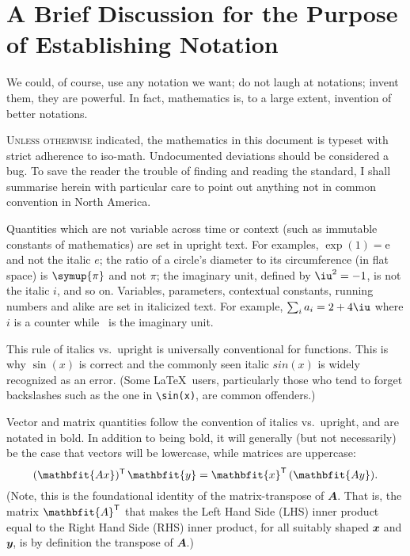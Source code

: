 %
\chapter{A Brief Discussion for the Purpose of Establishing Notation}%
\label{chap:notation}
\epigraph{
  We could, of course, use any notation we want; do not laugh at notations; invent them, they are powerful. In fact, mathematics is, to a large extent, invention of better notations.
}{
}

\noindent \textsc{Unless otherwise} indicated, the mathematics in this document
is typeset with strict adherence to \ac{iso-math}.
Undocumented deviations should be considered a bug. To save the reader the
trouble of finding and reading the standard, I shall summarise herein with
particular care to point out anything not in common convention in North America.

Quantities which are not variable across time or context (such as immutable
constants of mathematics) are set in upright text. For examples, $\exp(1) =
\mathup{e}$ and not the italic $e$; the ratio of a circle's diameter to its
circumference (in flat space) is $\symup{\pi}$ and not $\pi$; the imaginary
unit, defined by $\iu^2=-1$, is not the italic $i$, and so on. Variables,
parameters, contextual constants, running numbers  and alike are set in
italicized text. For example, $\sum_i a_i = 2+4\iu$ where $i$\/ is a counter
while \iu\ is the imaginary unit.

This rule of italics vs.\ upright is universally conventional for functions.
This is why $\sin(x)$ is correct and the commonly seen italic $sin(x)$ is widely
recognized as an error. (Some \LaTeX\ users, particularly those who tend to
forget backslashes such as the one in \verb|\sin(x)|, are common offenders.)

Vector and matrix quantities follow the convention of italics vs.\ upright, and
are notated in bold. In addition to being bold, it will generally (but not
necessarily) be the case that vectors will be lowercase, while matrices are
uppercase:
\begin{equation}\label{eq:transpose}
  (\mathbfit{Ax})\tr\,\mathbfit{y} = \mathbfit{x}\tr\,(\mathbfit{Ay}).
\end{equation}
(Note, this is the foundational identity of the matrix-transpose of
$\mathbfit{A}$. That is, the matrix $\mathbfit{A}\tr$ that makes the Left Hand
Side (LHS) inner product equal to the Right Hand Side (RHS) inner product, for
all suitably shaped $\mathbfit{x}$ and $\mathbfit{y}$, is by definition the
transpose of $\mathbfit{A}$.)

